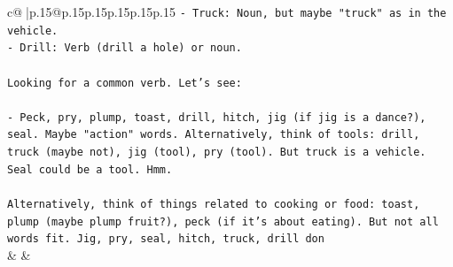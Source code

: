 \documentclass{article}
\begin{document}
{\begin{supertabular}{c@{$\;$}|p{.15\linewidth}@{}p{.15\linewidth}p{.15\linewidth}p{.15\linewidth}p{.15\linewidth}p{.15\linewidth}}
{{{\texttt{{-} Truck: Noun, but maybe "truck" as in the vehicle.} \\
\texttt{{-} Drill: Verb (drill a hole) or noun.} \\
\\ 
\texttt{Looking for a common verb. Let's see:} \\
\\ 
\texttt{{-} Peck, pry, plump, toast, drill, hitch, jig (if jig is a dance?), seal. Maybe "action" words. Alternatively, think of tools: drill, truck (maybe not), jig (tool), pry (tool). But truck is a vehicle. Seal could be a tool. Hmm.} \\
\\ 
\texttt{Alternatively, think of things related to cooking or food: toast, plump (maybe plump fruit?), peck (if it's about eating). But not all words fit. Jig, pry, seal, hitch, truck, drill don} \\
            }
        }
    }
    & & \\ \\


\end{supertabular}}
\end{document}
